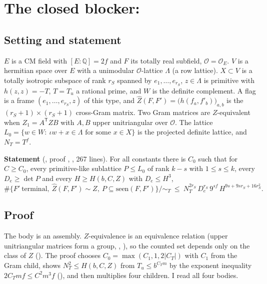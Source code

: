 \documentclass[11pt]{article}
\newcommand{\Ok}{\mathcal O}
\begin{document}
\section{The closed blocker: }\label{sec:ct}

\subsection{Setting and statement}

$E$ is a CM field with $[E:\mathbb Q]=2f$ and $F$ its totally real subfield, $\Ok=\Ok_E$. $V$ is a hermitian space over $E$ with a unimodular $\Ok$-lattice $\Lambda$ (a row lattice). $X\subset V$ is a totally isotropic subspace of rank $r_S$ spanned by $e_1,\dots,e_{r_S}$, $z\in\Lambda$ is primitive with $h(z,z)=-T$, $T=T_u$ a rational prime, and $W$ is the definite complement. A flag is a frame $(e_1,\dots,e_{r_S},z)$ of this type, and $\hat Z(F,F')=\bigl(h(f_a,f'_b)\bigr)_{a,b}$ is the $(r_S+1)\times(r_S+1)$ cross-Gram matrix. Two Gram matrices are $Z$-equivalent when $Z_1=A^{\mathsf T}ZB$ with $A,B$ upper unitriangular over $\Ok$. The lattice $L_0=\{w\in W:\ \iota w+x\in\Lambda \text{ for some } x\in X\}$ is the projected definite lattice, and $N_T=T^f$.

\textbf{Statement} (, proof , , 267 lines). For all constants there is $C_0$ such that for $C\ge C_0$, every primitive-like sublattice $P\le L_0$ of rank $k-s$ with $1\le s\le k$, every $D_e\ge\det P$ and every $H\ge H(b,C,Z)$ with $D_e\le H^3$,
\[
\#\bigl\{F'\ \text{terminal},\ \hat Z(F,F')\sim Z,\ P\subseteq \mathrm{seen}(F,F')\bigr\}/\!\sim_T\ \le\ N_T^{2r_S}\,D_e^{r_S}\,9^{sf}\,H^{9s+9sr_S+16r_S^2}.
\]

\subsection{Proof}

The body is an assembly. $Z$-equivalence is an equivalence relation (upper unitriangular matrices form a group, , ), so the counted set depends only on the class of $Z$ (). The proof chooses $C_0=\max(C_1,1,2|C_T|)$ with $C_1$ from the Gram child, shows $N_T^2\le H(b,C,Z)$ from $T_u\le b^{C_Tm}$ by the exponent inequality $2C_Tmf\le C^2m^3f$ (), and then multiplies four children. I read all four bodies.
\end{document}
